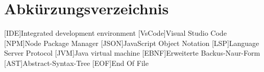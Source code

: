 \chapter*{Abkürzungsverzeichnis}

\begin{acronym}[LoRaWAN]

[IDE]{Integrated development environment}
[VsCode]{Visual Studio Code}
[NPM]{Node Package Manager}
[JSON]{JavaScript Object Notation}
[LSP]{Language Server Protocol}
[JVM]{Java virtual machine}
[EBNF]{Erweiterte Backus-Naur-Form}
[AST]{Abstract-Syntax-Tree}
[EOF]{End Of File}


\end{acronym}
